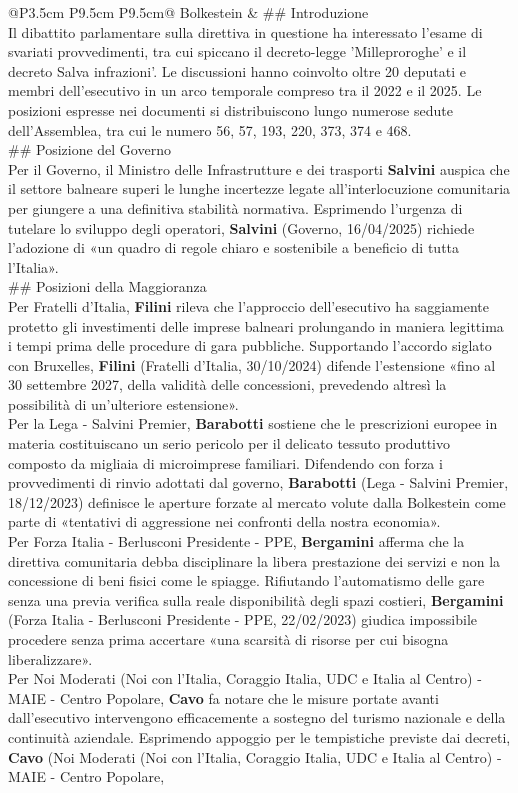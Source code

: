 \documentclass[a4paper,11pt]{article}
\begin{document}
\begin{landscape}
\begin{longtable}{@{}P{3.5cm} P{9.5cm} P{9.5cm}@{}}
Bolkestein & \#\# Introduzione\\[6pt] Il dibattito parlamentare sulla direttiva in questione ha interessato l'esame di svariati provvedimenti, tra cui spiccano il decreto-legge 'Milleproroghe' e il decreto Salva infrazioni'. Le discussioni hanno coinvolto oltre 20 deputati e membri dell'esecutivo in un arco temporale compreso tra il 2022 e il 2025. Le posizioni espresse nei documenti si distribuiscono lungo numerose sedute dell'Assemblea, tra cui le numero 56, 57, 193, 220, 373, 374 e 468.\\[6pt] \#\# Posizione del Governo\\[6pt] Per il Governo, il Ministro delle Infrastrutture e dei trasporti \textbf{Salvini} auspica che il settore balneare superi le lunghe incertezze legate all'interlocuzione comunitaria per giungere a una definitiva stabilità normativa. Esprimendo l'urgenza di tutelare lo sviluppo degli operatori, \textbf{Salvini} (Governo, 16/04/2025) richiede l'adozione di «un quadro di regole chiaro e sostenibile a beneficio di tutta l'Italia».\\[6pt] \#\# Posizioni della Maggioranza\\[6pt] Per Fratelli d'Italia, \textbf{Filini} rileva che l'approccio dell'esecutivo ha saggiamente protetto gli investimenti delle imprese balneari prolungando in maniera legittima i tempi prima delle procedure di gara pubbliche. Supportando l'accordo siglato con Bruxelles, \textbf{Filini} (Fratelli d'Italia, 30/10/2024) difende l'estensione «fino al 30 settembre 2027, della validità delle concessioni, prevedendo altresì la possibilità di un'ulteriore estensione».\\[6pt] Per la Lega - Salvini Premier, \textbf{Barabotti} sostiene che le prescrizioni europee in materia costituiscano un serio pericolo per il delicato tessuto produttivo composto da migliaia di microimprese familiari. Difendendo con forza i provvedimenti di rinvio adottati dal governo, \textbf{Barabotti} (Lega - Salvini Premier, 18/12/2023) definisce le aperture forzate al mercato volute dalla Bolkestein come parte di «tentativi di aggressione nei confronti della nostra economia».\\[6pt] Per Forza Italia - Berlusconi Presidente - PPE, \textbf{Bergamini} afferma che la direttiva comunitaria debba disciplinare la libera prestazione dei servizi e non la concessione di beni fisici come le spiagge. Rifiutando l'automatismo delle gare senza una previa verifica sulla reale disponibilità degli spazi costieri, \textbf{Bergamini} (Forza Italia - Berlusconi Presidente - PPE, 22/02/2023) giudica impossibile procedere senza prima accertare «una scarsità di risorse per cui bisogna liberalizzare».\\[6pt] Per Noi Moderati (Noi con l'Italia, Coraggio Italia, UDC e Italia al Centro) - MAIE - Centro Popolare, \textbf{Cavo} fa notare che le misure portate avanti dall'esecutivo intervengono efficacemente a sostegno del turismo nazionale e della continuità aziendale. Esprimendo appoggio per le tempistiche previste dai decreti, \textbf{Cavo} (Noi Moderati (Noi con l'Italia, Coraggio Italia, UDC e Italia al Centro) - MAIE - Centro Popolare, 
\end{longtable}
\end{landscape}
\end{document}
